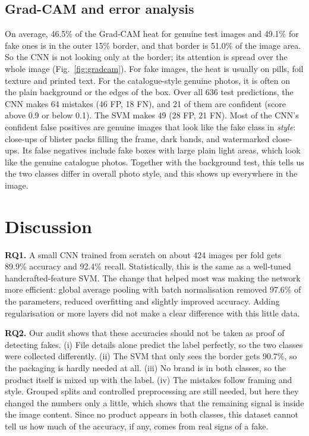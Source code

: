 \documentclass[conference]{IEEEtran}
\begin{document}
\subsection{Grad-CAM and error analysis}
On average, 46.5\% of the Grad-CAM heat for genuine test images and 49.1\% for fake ones is in the outer 15\% border, and that border is 51.0\% of the image area. So the CNN is not looking only at the border; its attention is spread over the whole image (Fig.~\ref{fig:gradcam}). For fake images, the heat is usually on pills, foil texture and printed text. For the catalogue-style genuine photos, it is often on the plain background or the edges of the box. Over all 636 test predictions, the CNN makes 64 mistakes (46 FP, 18 FN), and 21 of them are confident (score above 0.9 or below 0.1). The SVM makes 49 (28 FP, 21 FN). Most of the CNN's confident false positives are genuine images that look like the fake class in \emph{style}: close-ups of blister packs filling the frame, dark bands, and watermarked close-ups. Its false negatives include fake boxes with large plain light areas, which look like the genuine catalogue photos. Together with the background test, this tells us the two classes differ in overall photo style, and this shows up everywhere in the image.

\section{Discussion}
\textbf{RQ1.} A small CNN trained from scratch on about 424 images per fold gets 89.9\% accuracy and 92.4\% recall. Statistically, this is the same as a well-tuned handcrafted-feature SVM. The change that helped most was making the network more efficient: global average pooling with batch normalisation removed 97.6\% of the parameters, reduced overfitting and slightly improved accuracy. Adding regularisation or more layers did not make a clear difference with this little data.

\textbf{RQ2.} Our audit shows that these accuracies should not be taken as proof of detecting fakes. (i) File details alone predict the label perfectly, so the two classes were collected differently. (ii) The SVM that only sees the border gets 90.7\%, so the packaging is hardly needed at all. (iii) No brand is in both classes, so the product itself is mixed up with the label. (iv) The mistakes follow framing and style. Grouped splits and controlled preprocessing are still needed, but here they changed the numbers only a little, which shows that the remaining signal is inside the image content. Since no product appears in both classes, this dataset cannot tell us how much of the accuracy, if any, comes from real signs of a fake.
\end{document}
